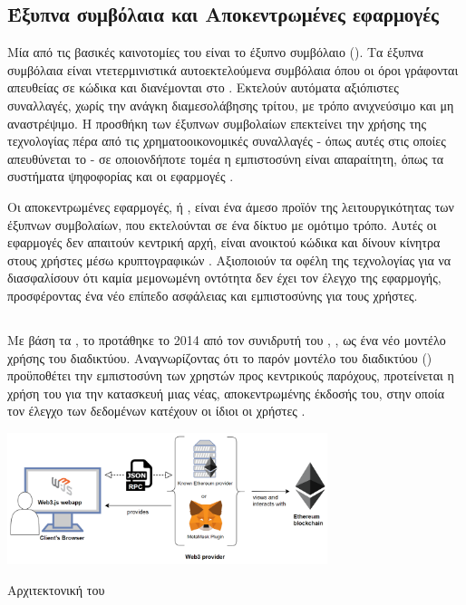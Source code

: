 \subsection{Έξυπνα συμβόλαια και Aποκεντρωμένες εφαρμογές}
Μία από τις βασικές καινοτομίες του  είναι το έξυπνο συμβόλαιο (). Τα έξυπνα συμβόλαια είναι ντετερμινιστικά αυτοεκτελούμενα συμβόλαια όπου οι όροι γράφονται απευθείας σε κώδικα και διανέμονται στο  \cite{ref14,ref15}. Εκτελούν αυτόματα αξιόπιστες συναλλαγές, χωρίς την ανάγκη διαμεσολάβησης τρίτου, με τρόπο ανιχνεύσιμο και μη αναστρέψιμο. Η προσθήκη των έξυπνων συμβολαίων επεκτείνει την χρήσης της τεχνολογίας  πέρα από τις χρηματοοικονομικές συναλλαγές - όπως αυτές στις οποίες απευθύνεται το  - σε οποιονδήποτε τομέα η εμπιστοσύνη είναι απαραίτητη, όπως τα συστήματα ψηφοφορίας και οι εφαρμογές  \cite{ref16}.

Οι αποκεντρωμένες εφαρμογές, ή  \cite{ref17,ref18}, είναι ένα άμεσο προϊόν της λειτουργικότητας των έξυπνων συμβολαίων, που εκτελούνται σε ένα δίκτυο  με ομότιμο τρόπο. Αυτές οι εφαρμογές δεν απαιτούν κεντρική αρχή, είναι ανοικτού κώδικα και δίνουν κίνητρα στους χρήστες μέσω κρυπτογραφικών . Αξιοποιούν τα οφέλη της τεχνολογίας  για να διασφαλίσουν ότι καμία μεμονωμένη οντότητα δεν έχει τον έλεγχο της εφαρμογής, προσφέροντας ένα νέο επίπεδο ασφάλειας και εμπιστοσύνης για τους χρήστες.


\subsection{}
Με βάση τα , το  προτάθηκε το 2014 από τον συνιδρυτή του , , ως ένα νέο μοντέλο χρήσης του διαδικτύου. Αναγνωρίζοντας ότι το παρόν μοντέλο του διαδικτύου () προϋποθέτει την εμπιστοσύνη των χρηστών προς κεντρικούς παρόχους, προτείνεται η χρήση του  για την κατασκευή μιας νέας, αποκεντρωμένης έκδοσής του, στην οποία τον έλεγχο των δεδομένων κατέχουν οι ίδιοι οι χρήστες \cite{ref19}.

\begin{illustration}
    \centering
    \includegraphics[width=0.7\textwidth]{figures/figure-002.png}
    \caption{Αρχιτεκτονική του } 
    \cite{ref14} 
\end{illustration}

